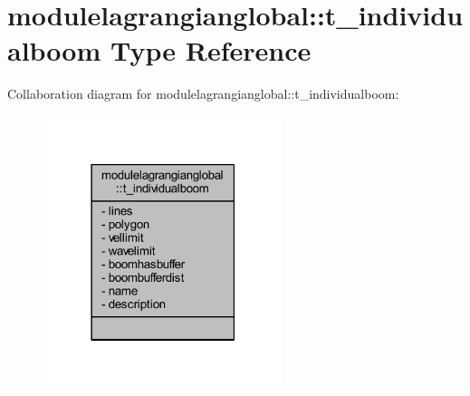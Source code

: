 \hypertarget{structmodulelagrangianglobal_1_1t__individualboom}{}\section{modulelagrangianglobal\+:\+:t\+\_\+individualboom Type Reference}
\label{structmodulelagrangianglobal_1_1t__individualboom}


Collaboration diagram for modulelagrangianglobal\+:\+:t\+\_\+individualboom\+:\nopagebreak
\begin{figure}[H]
\begin{center}
\leavevmode
\includegraphics[width=198pt]{structmodulelagrangianglobal_1_1t__individualboom__coll__graph}
\end{center}
\end{figure}
